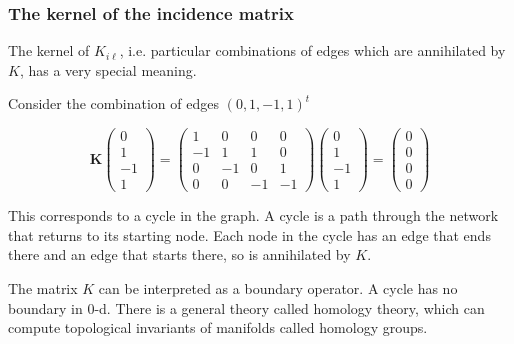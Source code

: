 \documentclass[10pt,aspectratio=169,dvipsnames]{beamer}
\begin{document}
\begin{frame}
  \frametitle{The kernel of the incidence matrix}

  The kernel of $K_{i\ell}$, i.e. particular combinations of edges which
  are annihilated by $K$, has a very special meaning.

  Consider the combination of edges $(0,1,-1,1)^t$

  \begin{equation*}
\mathbf{K}\left(\begin{matrix}
0 \\
1 \\
-1 \\
1
\end{matrix}\right)=\left(\begin{matrix}
1 & 0 & 0 & 0\\
-1 & 1 & 1 & 0\\
0 & -1 & 0 & 1\\
0 & 0 & -1 & -1
\end{matrix}\right)\left(\begin{matrix}
0 \\
1 \\
-1 \\
1
\end{matrix}\right) = \left(\begin{matrix}
0 \\
0 \\
0 \\
0
\end{matrix}\right)
\end{equation*}

  This corresponds to a \alert{cycle} in the graph. A cycle is a path
  through the network that returns to its starting node. Each node
  in the cycle has an edge that ends there and an edge that starts
  there, so is annihilated by $K$.

  The matrix $K$ can be interpreted as a \alert{boundary operator}. A
  cycle has no boundary in 0-d. There is a general theory called
  \alert{homology theory}, which can compute topological invariants of
  manifolds called \alert{homology groups}.

\end{frame}
\end{document}
